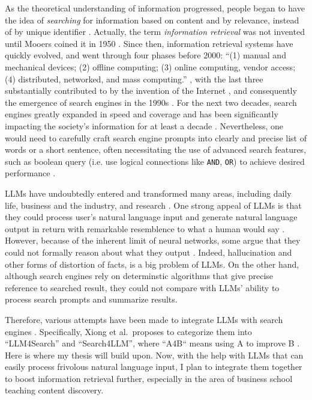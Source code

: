 \documentclass[final-report]{report-template}
\begin{document}
As the theoretical understanding of information progressed, people began to
have the idea of \emph{searching} for information based on content
and by relevance, instead of by unique identifier
\cite{history.information.retrieval}. Actually, the term \emph{information
retrieval} was not invented until Mooers coined it in 1950
\cite{mooers.info.ret.term}. Since then, information retrieval systems have
quickly evolved, and went through four phases before 2000: ``(1) manual and mechanical
devices; (2) offline computing; (3) online computing, vendor access; (4)
distributed, networked, and mass computing.'' \cite{info.ret.4.phases}, with
the last three substantially contributed to by the invention of the Internet
\cite{history.internet}, and consequently the emergence of search engines in
the 1990s \cite{history.search.engines, history.internet.search.engines}.
For the next two decades, search engines greatly expanded in speed and
coverage and has been significantly impacting the society's information for at
least a decade \cite{search.engine.impact.1, search.engine.impact.2}.
Nevertheless, one would need to carefully craft search engine prompts into
clearly and precise list of words or a short sentence, often necessitating the
use of advanced search features, such as boolean query (i.e. use logical
connections like \texttt{AND}, \texttt{OR}) to achieve desired performance
\cite{advanced.search.necessity.1, advanced.search.necessity.2}.


LLMs have undoubtedly entered and transformed many areas, including daily life,
business and the industry, and research \cite{llm.impact.1}. One strong appeal
of LLMs is that they could process user's natural language input and generate
natural language output in return with remarkable resemblence to what a human
would say \cite{llm.power.1, llm.power.2}. However, because of the inherent
limit of neural networks, some argue that they could not formally reason about
what they output \cite{llm.limit.1, llm.limit.2, llm.limit.3}. Indeed,
hallucination \cite{llm.hallucination.1, llm.hallucination.2} and other forms
of distortion of facts, is a big problem of LLMs. On the other hand, although
search engines rely on determinstic algorithms that give precise reference to
searched result, they could not compare with LLMs' ability to process search
prompts and summarize results. 

Therefore, various attempts have been made to integrate LLMs with search
engines \cite{llm.meet.search.1, llm.meet.search.2, llm.meet.search.3}.
Specifically, Xiong et al.\ proposes to categorize them into ``LLM4Search'' and
``Search4LLM'', where ``A4B`` means using A to improve B
\cite{llm.meet.search.1}. Here is where my thesis will build upon.  Now, with
the help with LLMs that can easily process frivolous natural language input, I
plan to integrate them together to boost information retrieval further,
especially in the area of business school teaching content discovery.
\end{document}
